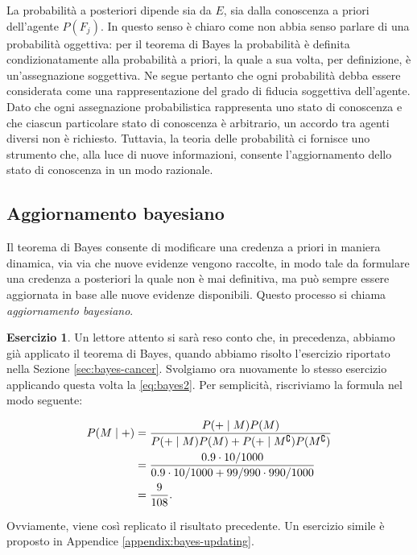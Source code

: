 \documentclass[
  11pt,
]{krantz}
\theoremstyle{definition}
\theoremstyle{definition}
\theoremstyle{definition}
\newtheorem{exercise}{Esercizio}[chapter]
\theoremstyle{definition}
\theoremstyle{remark}
\begin{document}
La probabilità a posteriori dipende sia da \(E\), sia dalla conoscenza a priori dell'agente \(P(F_j)\). In questo senso è chiaro come non abbia senso parlare di una probabilità oggettiva: per il teorema di Bayes la probabilità è definita condizionatamente alla probabilità a priori, la quale a sua volta, per definizione, è un'assegnazione soggettiva. Ne segue pertanto che ogni probabilità debba essere considerata come una rappresentazione del grado di fiducia soggettiva dell'agente. Dato che ogni assegnazione probabilistica rappresenta uno stato di conoscenza e che ciascun particolare stato di conoscenza è arbitrario, un accordo tra agenti diversi non è richiesto. Tuttavia, la teoria delle probabilità ci fornisce uno strumento che, alla luce di nuove informazioni, consente l'aggiornamento dello stato di conoscenza in un modo razionale.

\hypertarget{aggiornamento-bayesiano}{%
\subsection{Aggiornamento bayesiano}\label{aggiornamento-bayesiano}}

Il teorema di Bayes consente di modificare una credenza a priori in maniera dinamica, via via che nuove evidenze vengono raccolte, in modo tale da formulare una credenza a posteriori la quale non è mai definitiva, ma può sempre essere aggiornata in base alle nuove evidenze disponibili. Questo processo si chiama \emph{aggiornamento bayesiano}.

\begin{exercise}

Un lettore attento si sarà reso conto che, in precedenza, abbiamo già applicato il teorema di Bayes, quando abbiamo risolto l'esercizio riportato nella Sezione \ref{sec:bayes-cancer}. Svolgiamo ora nuovamente lo stesso esercizio applicando questa volta la \eqref{eq:bayes2}. Per semplicità, riscriviamo la formula nel modo seguente:

\begin{align}
P(M \mid +) &= \frac{P(+ \mid M) P(M)}{P(+ \mid M) P(M) + P(+ \mid M^\complement) P(M^\complement)}\notag\\ 
&= \frac{0.9 \cdot 10/1000}{0.9 \cdot 10/1000 + 99 / 990 \cdot 990 / 1000} \notag\\
&= \frac{9}{108}.
\end{align}

Ovviamente, viene così replicato il risultato precedente. Un esercizio simile è proposto in Appendice \ref{appendix:bayes-updating}.

\end{exercise}
\end{document}
